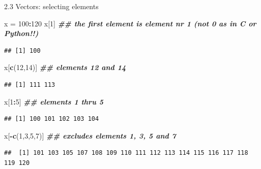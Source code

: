\documentclass[
  ignorenonframetext,
]{beamer}
\newenvironment{Shaded}{\begin{snugshade}}{\end{snugshade}}
\newcommand{\DecValTok}[1]{\textcolor[rgb]{0.00,0.00,0.81}{#1}}
\newcommand{\DocumentationTok}[1]{\textcolor[rgb]{0.56,0.35,0.01}{\textbf{\textit{#1}}}}
\newcommand{\FunctionTok}[1]{\textcolor[rgb]{0.13,0.29,0.53}{\textbf{#1}}}
\newcommand{\NormalTok}[1]{#1}
\newcommand{\OtherTok}[1]{\textcolor[rgb]{0.56,0.35,0.01}{#1}}
\newcommand{\SpecialCharTok}[1]{\textcolor[rgb]{0.81,0.36,0.00}{\textbf{#1}}}
\begin{document}
\begin{frame}[fragile]{2.3 Vectors: selecting elements}
\protect\hypertarget{vectors-selecting-elements}{}
\begin{Shaded}
\begin{Highlighting}[]
\NormalTok{x }\OtherTok{=} \DecValTok{100}\SpecialCharTok{:}\DecValTok{120}
\NormalTok{x[}\DecValTok{1}\NormalTok{]           }\DocumentationTok{\#\# the first element is element nr 1 (not 0 as in C or Python!!) }
\end{Highlighting}
\end{Shaded}

\begin{verbatim}
## [1] 100
\end{verbatim}

\begin{Shaded}
\begin{Highlighting}[]
\NormalTok{x[}\FunctionTok{c}\NormalTok{(}\DecValTok{12}\NormalTok{,}\DecValTok{14}\NormalTok{)]    }\DocumentationTok{\#\# elements 12 and 14}
\end{Highlighting}
\end{Shaded}

\begin{verbatim}
## [1] 111 113
\end{verbatim}

\begin{Shaded}
\begin{Highlighting}[]
\NormalTok{x[}\DecValTok{1}\SpecialCharTok{:}\DecValTok{5}\NormalTok{]         }\DocumentationTok{\#\# elements 1 thru 5}
\end{Highlighting}
\end{Shaded}

\begin{verbatim}
## [1] 100 101 102 103 104
\end{verbatim}

\begin{Shaded}
\begin{Highlighting}[]
\NormalTok{x[}\SpecialCharTok{{-}}\FunctionTok{c}\NormalTok{(}\DecValTok{1}\NormalTok{,}\DecValTok{3}\NormalTok{,}\DecValTok{5}\NormalTok{,}\DecValTok{7}\NormalTok{)] }\DocumentationTok{\#\# excludes elements 1, 3, 5 and 7 }
\end{Highlighting}
\end{Shaded}

\begin{verbatim}
##  [1] 101 103 105 107 108 109 110 111 112 113 114 115 116 117 118 119 120
\end{verbatim}
\end{frame}
\end{document}
